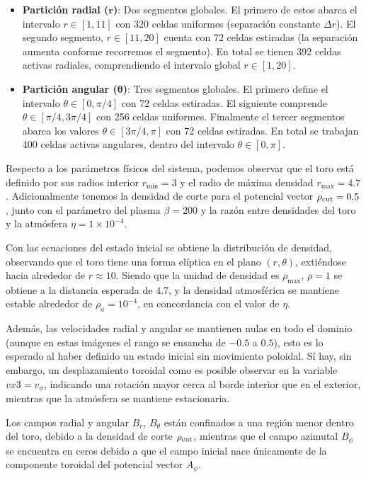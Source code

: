 \documentclass[11pt, letterpaper]{article}
\begin{document}
\begin{itemize}
    \item \textbf{Partición radial ($\mathbf{r}$)}: Dos segmentos globales. El primero de estos abarca el intervalo $r \in [1, 11]$ con 320 celdas uniformes (separación constante $\Delta r$). El segundo segmento, $r \in [11, 20]$ cuenta con 72 celdas estiradas (la separación aumenta conforme recorremos el segmento). En total se tienen 392 celdas activas radiales, comprendiendo el intervalo global $r \in [1, 20]$.
    \item \textbf{Partición angular ($\mathbf{\theta}$)}: Tres segmentos globales. El primero define el intervalo $\theta \in [0, \pi/4]$ con 72 celdas estiradas. El siguiente comprende $\theta \in [\pi/4, 3\pi/4]$ con 256 celdas uniformes. Finalmente el tercer segmentos abarca los valores $\theta \in [3\pi/4, \pi]$ con 72 celdas estiradas. En total se trabajan 400 celdas activas angulares, dentro del intervalo $\theta \in [0, \pi]$.
\end{itemize}
Respecto a los parámetros físicos del sistema, podemos observar que el toro está definido por sus radios interior $r_{\min} = 3$ y el radio de máxima densidad $r_{\max} = 4.7$. Adicionalmente tenemos la densidad de corte para el potencial vector $\rho_{\rm cut} = 0.5$, junto con el parámetro del plasma $\beta = 200$ y la razón entre densidades del toro y la atmósfera $\eta = 1\times10^{-4}$.  

\medskip

Con las ecuaciones del estado inicial se obtiene la distribución de densidad, observando que el toro tiene una forma elíptica en el plano $(r, \theta)$, extiéndose hacia alrededor de $r\approx10$. Siendo que la unidad de densidad es $\rho_{\max}$, $\rho = 1$ se obtiene a la distancia esperada de $4.7$, y la densidad atmosférica se mantiene estable alrededor de $\rho_a = 10^{-4}$, en concordancia con el valor de $\eta$.

\medskip

Además, las velocidades radial y angular se mantienen nulas en todo el dominio (aunque en estas imágenes el rango se ensancha de $-0.5$ a $0.5$), esto es lo esperado al haber definido un estado inicial sin movimiento poloidal. Sí hay, sin embargo, un desplazamiento toroidal como es posible observar en la variable $vx3 = v_{\phi}$, indicando una rotación mayor cerca al borde interior que en el exterior, mientras que la atmósfera se mantiene estacionaria.

\medskip

Los campos radial y angular $B_r$, $B_{\theta}$ están confinados a una región menor dentro del toro, debido a la densidad de corte $\rho_{\rm{cut}}$, mientras que el campo azimutal $B_{\phi}$ se encuentra en ceros debido a que el campo inicial nace únicamente de la componente toroidal del potencial vector $A_{\phi}$.
\end{document}
